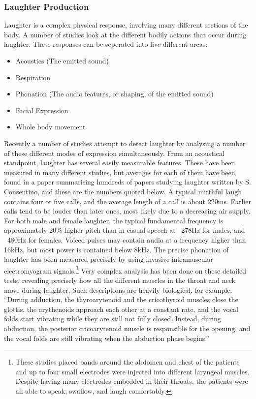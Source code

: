 \documentclass[a4paper,11pt,notitlepage]{article}
\begin{document}
\subsubsection{Laughter Production}
Laughter is a complex physical response, involving many different sections of the body. A number of studies look at the different bodily actions that occur during laughter. These responses can be seperated into five different areas:\cite{cosentino2016quantitative}
\begin{itemize}
\item Acoustics (The emitted sound)
\item Respiration
\item Phonation (The audio features, or shaping, of the emitted sound)
\item Facial Expression
\item Whole body movement
\end{itemize}
Recently a number of studies attempt to detect laughter by analysing a number of these different modes of expression simultaneously.\cite{petridis2008audiovisual,scherer2009multimodal} From an acoustical standpoint, laughter has several easily measurable features. These have been measured in many different studies, but averages for each of them have been found in a paper summarising hundreds of papers studying laughter written by S. Consentino\cite{cosentino2016quantitative}, and these are the numbers quoted below. A typical mirthful laugh contains four or five calls, and the average length of a call is about 220ms. Earlier calls tend to be louder than later ones, most likely due to a decreasing air supply. For both male and female laughter, the typical fundamental frequency is approximately 20\% higher pitch than in casual speech at ~278Hz for males, and ~480Hz for females. Voiced pulses may contain audio at a frequency higher than 16kHz, but most power is contained below 8kHz. The precise phonation of laughter has been measured precisely by using invasive intramuscular electromyogram signals.\footnote{These studies placed bands around the abdomen and chest of the patients and up to four small electrodes were injected into different laryngeal muscles. Despite having many electrodes embedded in their throats, the patients were all able to speak, swallow, and laugh comfortably.} Very complex analysis has been done on these detailed tests, revealing precisely how all the different muscles in the throat and neck move during laughter. Such descriptions are heavily biological, for example: ``During adduction, the thyroarytenoid and the cricothyroid muscles close the glottis, the arythenoids approach each other at a constant rate, and the vocal folds start vibrating while they are still not fully closed. Instead, during abduction, the posterior cricoarytenoid muscle is responsible for the opening, and the vocal folds are still vibrating when the abduction phase begins.''\cite{cosentino2016quantitative}\\
\end{document}
